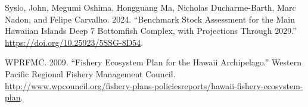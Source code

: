 \documentclass[
  letterpaper,
  12pt,
  letterpaper]{report}
\newlength{\cslhangindent}
\newenvironment{CSLReferences}[2] %
 {\begin{list}{}{%
  \setlength{\itemindent}{0pt}
  \setlength{\leftmargin}{0pt}
  \setlength{\parsep}{0pt}
  \ifodd #1
   \setlength{\leftmargin}{\cslhangindent}
   \setlength{\itemindent}{-1\cslhangindent}
  \fi
  \setlength{\itemsep}{#2\baselineskip}}}
 {\end{list}}
\begin{document}
\begin{CSLReferences}{1}{0}
Syslo, John, Megumi Oshima, Hongguang Ma, Nicholas Ducharme-Barth, Marc
Nadon, and Felipe Carvalho. 2024. {``Benchmark Stock Assessment for the
Main {Hawaiian} {Islands} {Deep} 7 Bottomfish Complex, with Projections
Through 2029.''} \url{https://doi.org/10.25923/5SSG-8D54}.

WPRFMC. 2009. {``Fishery {Ecosystem} {Plan} for the {Hawaii}
{Archipelago}.''} Western Pacific Regional Fishery Management Council.
\url{http://www.wpcouncil.org/fishery-plans-policiesreports/hawaii-fishery-ecosystem-plan}.

\end{CSLReferences}
\end{document}
